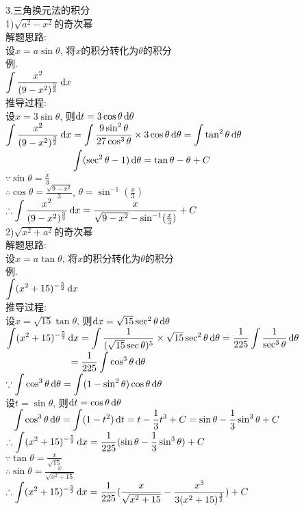 3.三角换元法的积分\\
1)$\sqrt{a^2-x^2}$的奇次幂\\
解题思路:\\
设$x=a\sin\theta$, 将$x$的积分转化为$\theta$的积分\\
例.\\
\phantom{例}$\displaystyle\int\frac{x^2}{(9-x^2)^{\frac{3}{2}}}\mathop{}\!\mathrm{d} x$\\
推导过程:\\
设$x=3\sin\theta$, 则$\mathop{}\!\mathrm{d} t=3\cos\theta\mathop{}\!\mathrm{d}\theta$\\
$\displaystyle\int\frac{x^2}{(9-x^2)^{\frac{3}{2}}}\mathop{}\!\mathrm{d} x=\int\frac{9\sin^2\theta}{27\cos^3\theta}\times3\cos\theta\mathop{}\!\mathrm{d}\theta=\int\tan^2\theta\mathop{}\!\mathrm{d}\theta$\\
$\displaystyle\phantom{\int\frac{x^2}{(9-x^2)^{\frac{3}{2}}}\dif x}\int(\sec^2\theta-1)\dif\theta=\tan\theta-\theta+C$\\
$\displaystyle\because\sin\theta=\frac{x}{3}$\\
$\displaystyle\therefore\cos\theta=\frac{\sqrt{9-x^2}}{3}$, $\theta=\sin^{-1}(\frac{x}{3})$\\
$\displaystyle\therefore\int\frac{x^2}{(9-x^2)^{\frac{3}{2}}}\mathop{}\!\mathrm{d} x=\frac{x}{\sqrt{9-x^2}-\sin^{-1}(\frac{x}{3})}+C$\\

2)$\sqrt{x^2+a^2}$的奇次幂\\
解题思路:\\
设$x=a\tan\theta$, 将$x$的积分转化为$\theta$的积分\\
例.\\
\phantom{例}$\displaystyle\int(x^2+15)^{-\frac{5}{2}}\mathop{}\!\mathrm{d} x$\\
推导过程:\\
设$x=\sqrt{15}\tan\theta$, 则$\mathop{}\!\mathrm{d} x=\sqrt{15}\sec^2\theta\mathop{}\!\mathrm{d}\theta$\\
$\displaystyle\int(x^2+15)^{-\frac{5}{2}}\mathop{}\!\mathrm{d} x=\int\frac{1}{(\sqrt{15}\sec\theta)^5}\times\sqrt{15}\sec^2\theta\mathop{}\!\mathrm{d}\theta=\frac{1}{225}\int\frac{1}{\sec^3\theta}\mathop{}\!\mathrm{d}\theta$\\
$\displaystyle\phantom{\int(x^+15)^{-\frac{5}{2}}\dif x}=\frac{1}{225}\int\cos^3\theta\dif\theta$\\
$\displaystyle\because\int\cos^3\theta\mathop{}\!\mathrm{d}\theta=\int(1-\sin^2\theta)\cos\theta\mathop{}\!\mathrm{d}\theta$\\
\phantom{$\displaystyle\because$}设$t=\sin\theta$, 则$\mathop{}\!\mathrm{d} t=\cos\theta\mathop{}\!\mathrm{d}\theta$\\
$\displaystyle\phantom{\because}\int\cos^3\theta\mathop{}\!\mathrm{d}\theta=\int(1-t^2)\mathop{}\!\mathrm{d} t=t-\frac{1}{3}t^3+C=\sin\theta-\frac{1}{3}\sin^3\theta+C$\\
$\displaystyle\therefore\int(x^2+15)^{-\frac{5}{2}}\mathop{}\!\mathrm{d} x=\frac{1}{225}(\sin\theta-\frac{1}{3}\sin^3\theta)+C$\\
$\displaystyle\because\tan\theta=\frac{x}{\sqrt{15}}$\\
$\displaystyle\therefore\sin\theta=\frac{x}{\sqrt{x^2+15}}$\\
$\displaystyle\therefore\int(x^2+15)^{-\frac{5}{2}}\mathop{}\!\mathrm{d} x=\frac{1}{225}(\frac{x}{\sqrt{x^2+15}}-\frac{x^3}{3(x^2+15)^{\frac{3}{2}}})+C$\\

